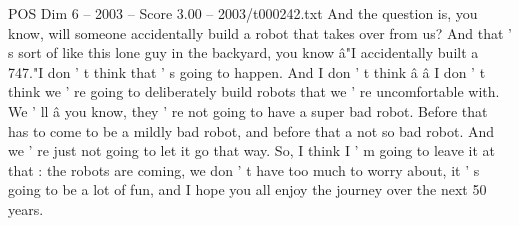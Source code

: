 \begin{textsample}{POS Dim 6 – 2003 – Score 3.00 – 2003/t000242.txt}
And the question is, you know, will someone accidentally build a robot that takes over from us?
And that ' s sort of like this lone guy in the backyard, you know â"I accidentally built a 747."I don ' t think that ' s going to happen.
And I don ' t think â â I don ' t think we ' re going to deliberately build robots that we ' re uncomfortable with.
We ' ll â you know, they ' re not going to have a super bad robot.
Before that has to come to be a mildly bad robot, and before that a not so bad robot.
And we ' re just not going to let it go that way.
So, I think I ' m going to leave it at that : the robots are coming, we don ' t have too much to worry about, it ' s going to be a lot of fun, and I hope you all enjoy the journey over the next 50 years.

\end{textsample}
